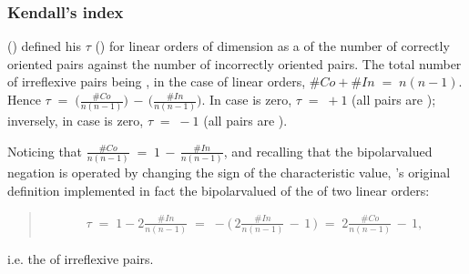 \documentclass[a4paper,12pt,english]{sphinxhowto}
\begin{document}
\subsubsection{Kendall’s  index}
\label{\detokenize{pearls:kendall-s-tau-index}}
\sphinxAtStartPar
{} () defined his  \(\tau\) ()  for linear orders of dimension  as a  of the number  of correctly oriented pairs against the number  of incorrectly oriented pairs. The total number of irreflexive pairs being , in the case of linear orders, \(\#Co + \#In \;=\; n(n-1)\).  Hence \(\tau \;=\; \big(\frac{\#Co}{n(n-1)}\big) \,-\, \big(\frac{\#In}{n(n-1)}\big)\). In case  is zero, \(\tau \;=\; +1\)  (all pairs are ); inversely, in case  is zero, \(\tau \;=\; -1\) (all pairs are ).

\sphinxAtStartPar
Noticing that \(\frac{\#Co}{n(n-1)} \;=\; 1 \,-\, \frac{\#In}{n(n-1)}\), and recalling that the bipolar\sphinxhyphen{}valued negation is operated by changing the sign of the characteristic value, ’s original  definition implemented in fact the bipolar\sphinxhyphen{}valued  of the  of two linear orders:
\begin{quote}
\begin{equation*}
\begin{split}\tau \;=\; 1 -2\frac{\#In}{n(n-1)} \;=\; -\big(\,2\frac{\#In}{n(n-1)} \,-\, 1\,\big) \;=\; 2\frac{\#Co}{n(n-1)} \,-\, 1,\end{split}
\end{equation*}\end{quote}

\sphinxAtStartPar
i.e. the  of  irreflexive pairs.
\end{document}
